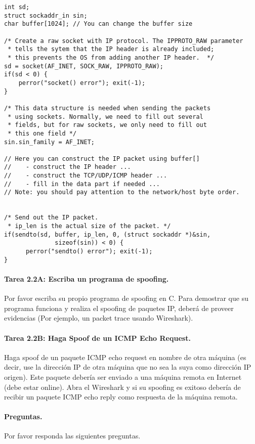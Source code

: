 \begin{lstlisting}
int sd;
struct sockaddr_in sin;
char buffer[1024]; // You can change the buffer size

/* Create a raw socket with IP protocol. The IPPROTO_RAW parameter
 * tells the sytem that the IP header is already included;
 * this prevents the OS from adding another IP header.  */
sd = socket(AF_INET, SOCK_RAW, IPPROTO_RAW);
if(sd < 0) {
    perror("socket() error"); exit(-1);
}

/* This data structure is needed when sending the packets 
 * using sockets. Normally, we need to fill out several 
 * fields, but for raw sockets, we only need to fill out
 * this one field */
sin.sin_family = AF_INET;

// Here you can construct the IP packet using buffer[]  
//    - construct the IP header ...
//    - construct the TCP/UDP/ICMP header ...
//    - fill in the data part if needed ...
// Note: you should pay attention to the network/host byte order.


/* Send out the IP packet. 
 * ip_len is the actual size of the packet. */  
if(sendto(sd, buffer, ip_len, 0, (struct sockaddr *)&sin, 
              sizeof(sin)) < 0) {
      perror("sendto() error"); exit(-1);
}
\end{lstlisting}



\paragraph{Tarea 2.2A: Escriba un programa de spoofing.}
Por favor escriba su propio programa de spoofing en C. Para demostrar que su programa funciona y realiza el spoofing de paquetes IP, deberá de proveer evidencias (Por ejemplo, un packet trace usando Wireshark).


\paragraph{Tarea 2.2B: Haga Spoof de un ICMP Echo Request.}
Haga spoof de un paquete ICMP echo request en nombre de otra máquina (es decir, use la dirección IP de otra máquina que no sea la suya como dirección IP origen). Este paquete debería ser enviado a una máquina remota en Internet (debe estar online). Abra el Wireshark y si su spoofing es exitoso debería de recibir un paquete ICMP echo reply como respuesta de la máquina remota.

\paragraph{Preguntas.} Por favor responda las siguientes preguntas.

